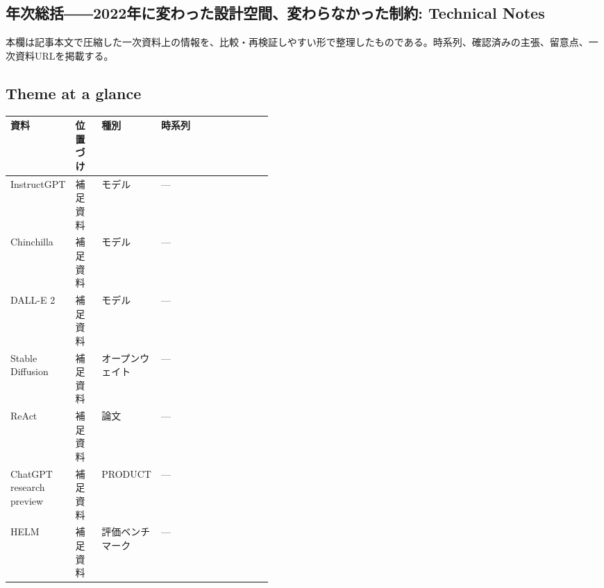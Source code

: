 \subsection*{年次総括――2022年に変わった設計空間、変わらなかった制約: Technical Notes}
本欄は記事本文で圧縮した一次資料上の情報を、比較・再検証しやすい形で整理したものである。時系列、確認済みの主張、留意点、一次資料URLを掲載する。
\smallskip
{}\par
\medskip
\subsection*{Theme at a glance}
\begin{center}
\footnotesize
\begin{tabularx}{\linewidth}{@{}p{0.20\linewidth}p{0.10\linewidth}p{0.14\linewidth}X@{}}
\toprule
資料 & 位置づけ & 種別 & 時系列 \\
\midrule
InstructGPT & 補足資料 & モデル & — \\
Chinchilla & 補足資料 & モデル & — \\
DALL-E 2 & 補足資料 & モデル & — \\
Stable Diffusion & 補足資料 & オープンウェイト & — \\
ReAct & 補足資料 & 論文 & — \\
ChatGPT research preview & 補足資料 & PRODUCT & — \\
HELM & 補足資料 & 評価ベンチマーク & — \\
\bottomrule
\end{tabularx}
\end{center}
\normalsize

